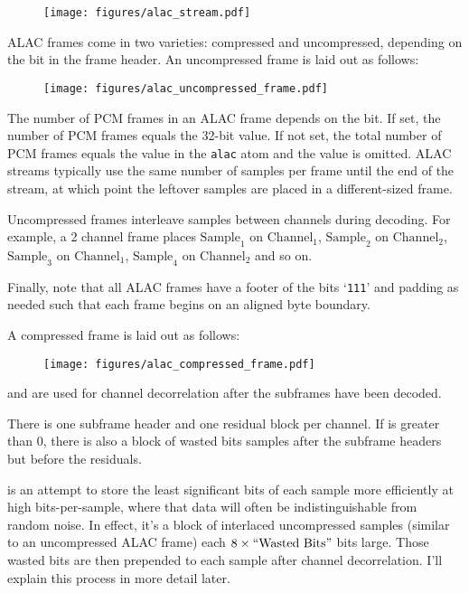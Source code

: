 \begin{figure}[h]
\texttt{[image: figures/alac\_stream.pdf]}
\end{figure}
\par
\noindent
ALAC frames come in two varieties: compressed and uncompressed,
depending on the  bit in the frame header.
An uncompressed frame is laid out as follows:
\label{alac_uncompressed}
\begin{figure}[h]
\texttt{[image: figures/alac\_uncompressed\_frame.pdf]}
\end{figure}
\par
\noindent
The number of PCM frames in an ALAC frame depends on the 
bit.
If set, the number of PCM frames equals the 32-bit 
value.
If not set, the total number of PCM frames equals the 
value in the \texttt{alac} atom and the  value is omitted.
ALAC streams typically use the same number of samples per frame
until the end of the stream, at which point the leftover samples
are placed in a different-sized frame.

Uncompressed frames interleave samples between channels during decoding.
For example, a 2 channel frame places $\text{Sample}_1$ on $\text{Channel}_1$,
$\text{Sample}_2$ on $\text{Channel}_2$,
$\text{Sample}_3$ on $\text{Channel}_1$,
$\text{Sample}_4$ on $\text{Channel}_2$ and so on.

Finally, note that all ALAC frames have a footer of the bits `\texttt{111}'
and padding as needed such that each frame begins on an aligned byte boundary.

\pagebreak

A compressed frame is laid out as follows:

\begin{figure}[h]
\texttt{[image: figures/alac\_compressed\_frame.pdf]}
\end{figure}
\par
\noindent
{} and  are used
for channel decorrelation after the subframes have been decoded.

There is one subframe header and one residual block per
channel.
If  is greater than 0, there is also
a block of wasted bits samples after the subframe headers but before
the residuals.

\label{alac_wasted_bits}
 is an attempt to store the least significant bits
of each sample more efficiently at high bits-per-sample, where
that data will often be indistinguishable from random noise.
In effect, it's a block of interlaced uncompressed samples
(similar to an uncompressed ALAC frame) each $8 \times \text{``{Wasted Bits}''}$
bits large.
Those wasted bits are then prepended to each sample after channel
decorrelation.
I'll explain this process in more detail later.

